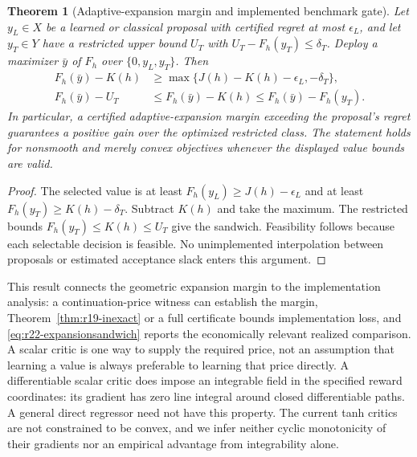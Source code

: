 \documentclass[11pt,letterpaper]{article}
\newtheorem{theorem}{Theorem}[section]
\theoremstyle{definition}
\newcommand{\1}{\mathbf 1}
\begin{document}
\begin{theorem}[Adaptive-expansion margin and implemented benchmark gate]\label{thm:r22-expansion}
Let $y_L\in X$ be a learned or classical proposal with certified regret at most $\epsilon_L$, and let $y_T\in Y$ have a restricted upper bound $U_T$ with $U_T-F_h(y_T)\leq\delta_T$. Deploy a maximizer $\bar y$ of $F_h$ over $\{0,y_L,y_T\}$. Then
\begin{align}
 F_h(\bar y)-K(h)&\geq\max\{J(h)-K(h)-\epsilon_L,-\delta_T\},\label{eq:r22-expansion}\\
 F_h(\bar y)-U_T&\leq F_h(\bar y)-K(h)
 \leq F_h(\bar y)-F_h(y_T).\label{eq:r22-expansionsandwich}
\end{align}
In particular, a certified adaptive-expansion margin exceeding the proposal's regret guarantees a positive gain over the optimized restricted class. The statement holds for nonsmooth and merely convex objectives whenever the displayed value bounds are valid.
\end{theorem}
\begin{proof}
The selected value is at least $F_h(y_L)\geq J(h)-\epsilon_L$ and at least $F_h(y_T)\geq K(h)-\delta_T$. Subtract $K(h)$ and take the maximum. The restricted bounds $F_h(y_T)\leq K(h)\leq U_T$ give the sandwich. Feasibility follows because each selectable decision is feasible. No unimplemented interpolation between proposals or estimated acceptance slack enters this argument.
\end{proof}
This result connects the geometric expansion margin to the implementation analysis: a continuation-price witness can establish the margin, Theorem~\ref{thm:r19-inexact} or a full certificate bounds implementation loss, and \eqref{eq:r22-expansionsandwich} reports the economically relevant realized comparison. A scalar critic is one way to supply the required price, not an assumption that learning a value is always preferable to learning that price directly. A differentiable scalar critic does impose an integrable field in the specified reward coordinates: its gradient has zero line integral around closed differentiable paths. A general direct regressor need not have this property. The current tanh critics are not constrained to be convex, and we infer neither cyclic monotonicity of their gradients nor an empirical advantage from integrability alone.
\end{document}
